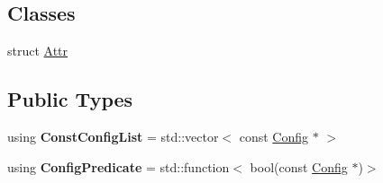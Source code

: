 \subsection*{Classes}
\begin{DoxyCompactItemize}
\item 
struct \hyperlink{structtheoria_1_1config_1_1Config_1_1Attr}{Attr}
\end{DoxyCompactItemize}
\subsection*{Public Types}
\begin{DoxyCompactItemize}
\item 
\mbox{\label{classtheoria_1_1config_1_1Config_a61230728ffa4d92667a536c8c0f0ca30}} 
using {\bfseries Const\+Config\+List} = std\+::vector$<$ const \hyperlink{classtheoria_1_1config_1_1Config}{Config} $\ast$ $>$
\item 
\mbox{\label{classtheoria_1_1config_1_1Config_a293ebfd7146d935e232a066f7e6fa279}} 
using {\bfseries Config\+Predicate} = std\+::function$<$ bool(const \hyperlink{classtheoria_1_1config_1_1Config}{Config} $\ast$)$>$
\end{DoxyCompactItemize}
